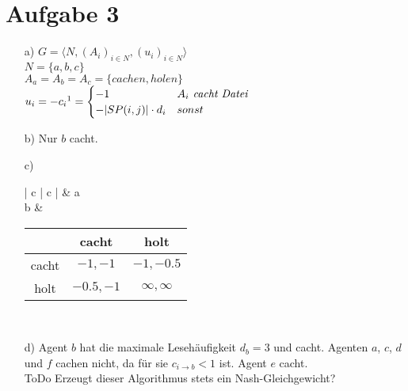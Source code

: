 \documentclass{article}
\begin{document}
\section*{Aufgabe 3}
	\begin{enumerate}
		\item [a)]
			$G = \langle N, (A_i)_{i \in N}, (u_i)_{i \in N} \rangle$ \\
			$N = \{ a, b, c \}$\\
			$A_a = A_b = A_c = \{ \mathit{cachen}, \mathit{holen}\}$\\
			
			$u_i = - c_i \footnote{Da die Kosten minimiert werden sollen.} = 
				\begin{cases}
					- 1 & \textit{$A_i$ cacht Datei}\\
					- |SP(i,j)| \cdot d_i & sonst
				\end{cases}
			$
		\item [b)]
			Nur $b$ cacht.
		\item [c)]
			\begin{tabular}{| c | c |} \hline
				 & a \\ \hline
				b & \begin{tabular}{ c | c | c} 
						& cacht & holt \\ \hline
						cacht & $-1, -1$ & $-1, -0.5$  \\ \hline
						holt & $-0.5, -1$ & $\infty, \infty$ \\ 
					\end{tabular} \\ \hline   
			\end{tabular}
		\item [d)]
			Agent $b$ hat die maximale Lesehäufigkeit $d_b=3$ und cacht.
			Agenten $a$, $c$, $d$ und $f$ cachen nicht, da für sie
			$c_{i \rightarrow b} < 1$ ist. Agent $e$ cacht. \\
			ToDo Erzeugt dieser Algorithmus stets ein Nash-Gleichgewicht?
	\end{enumerate}
\end{document}
